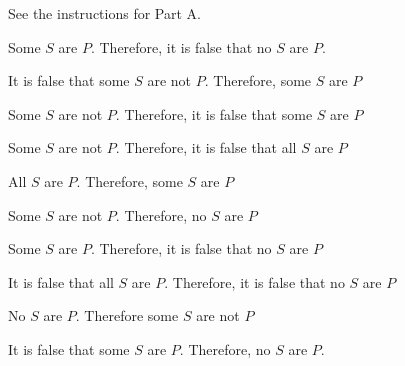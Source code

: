 \problempart See the instructions for Part A. 
\begin{exercises}
\item Some $S$ are $P$. Therefore, it is false that no $S$ are $P$.  
\item It is false that some $S$ are not $P$. Therefore, some $S$ are $P$		
\item Some $S$ are not $P$. Therefore, it is false that some $S$ are $P$   
\item Some $S$ are not $P$. Therefore, it is false that all $S$ are $P$	
\item All $S$ are $P$. Therefore, some $S$ are $P$    
\item Some $S$ are not $P$. Therefore, no $S$ are $P$		
\item Some $S$ are $P$. Therefore, it is false that no $S$ are $P$ 
\item It is false that all $S$ are $P$. Therefore, it is false that no $S$ are $P$  
\item No $S$ are $P$. Therefore some $S$ are not $P$    
\item It is false that some $S$ are $P$. Therefore, no $S$ are $P$.			
\end{exercises}


